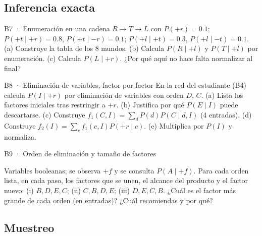 \subsection{Inferencia exacta}

\begin{ejercicio}{B7 · Enumeración en una cadena }
$R\to T\to L$ con $P(+r)=0.1$; $P(+t\mid+r)=0.8$, $P(+t\mid-r)=0.1$; $P(+l\mid+t)=0.3$, $P(+l\mid-t)=0.1$.
(a) Construye la tabla de los 8 mundos. (b) Calcula $P(R\mid+l)$ y $P(T\mid+l)$ por enumeración.
(c) Calcula $P(L\mid+r)$. ¿Por qué aquí no hace falta normalizar al final?
\end{ejercicio}

\begin{ejercicio}{B8 · Eliminación de variables, factor por factor }
En la red del estudiante (B4) calcula $P(I\mid+r)$ por eliminación de variables con orden $D$, $C$.
(a) Lista los factores iniciales tras restringir a $+r$. (b) Justifica por qué $P(E\mid I)$ puede descartarse.
(c) Construye $f_1(C,I)=\sum_dP(d)P(C\mid d,I)$ (4 entradas). (d) Construye $f_2(I)=\sum_cf_1(c,I)P(+r\mid c)$.
(e) Multiplica por $P(I)$ y normaliza.
\end{ejercicio}

\begin{ejercicio}{B9 · Orden de eliminación y tamaño de factores }
\begin{center}\figOrden\end{center}
Variables booleanas; se observa $+f$ y se consulta $P(A\mid+f)$. Para cada orden lista, en cada paso, los factores
que se unen, el alcance del producto y el factor nuevo: (i) $B,D,E,C$; (ii) $C,B,D,E$; (iii) $D,E,C,B$.
¿Cuál es el factor más grande de cada orden (en entradas)? ¿Cuál recomiendas y por qué?
\end{ejercicio}

\subsection{Muestreo}

